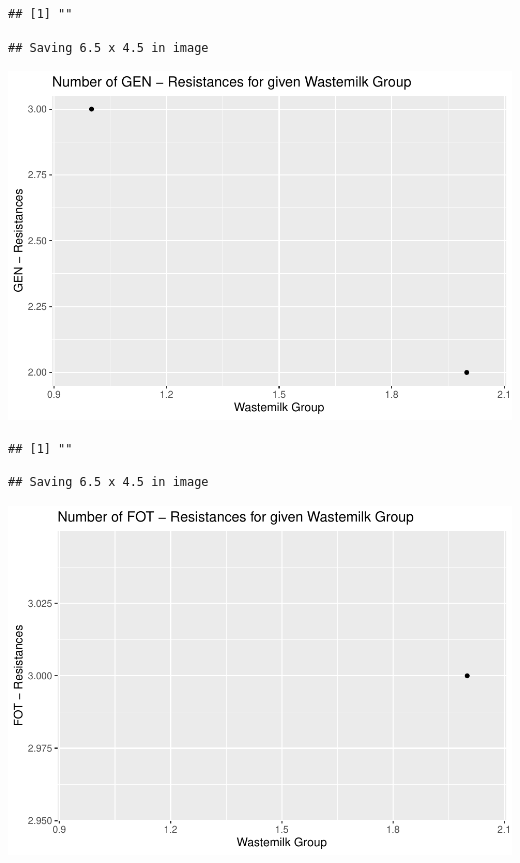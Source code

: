 \documentclass[
]{article}
\begin{document}
\begin{verbatim}
## [1] ""
\end{verbatim}

\begin{verbatim}
## Saving 6.5 x 4.5 in image
\end{verbatim}

\includegraphics{NResistenzen_files/figure-latex/binary_or_nominal_variables-4.pdf}

\begin{verbatim}
## [1] ""
\end{verbatim}

\begin{verbatim}
## Saving 6.5 x 4.5 in image
\end{verbatim}

\includegraphics{NResistenzen_files/figure-latex/binary_or_nominal_variables-5.pdf}
\end{document}

